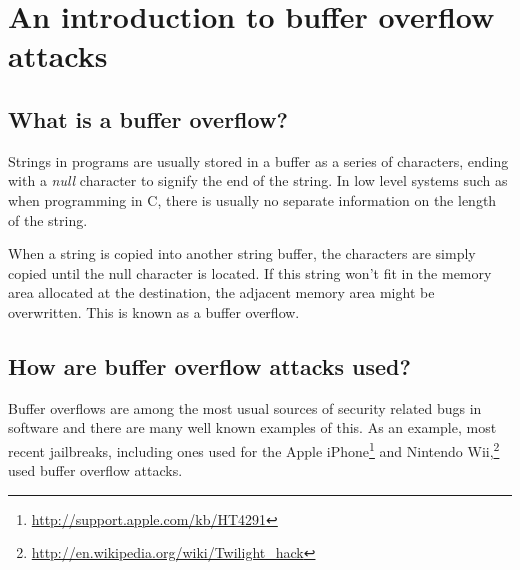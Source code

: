 \section{An introduction to buffer overflow attacks}
\subsection{What is a buffer overflow?}
Strings in programs are usually stored in a buffer as a series of characters,
ending with a \emph{null} character to signify the end of the string.
In low level systems such as when programming in C,
there is usually no separate information on the length of the string.

When a string is copied into another string buffer,
the characters are simply copied until the null character is located.
If this string won't fit in the memory area allocated at the destination,
the adjacent memory area might be overwritten.
This is known as a buffer overflow.

\subsection{How are buffer overflow attacks used?}
Buffer overflows are among the most usual sources of
security related bugs in software and
there are many well known examples of this.
As an example, most recent jailbreaks,
including ones used
for the Apple iPhone\footnote{\url{http://support.apple.com/kb/HT4291}}
and Nintendo Wii,\footnote{\url{http://en.wikipedia.org/wiki/Twilight_hack}}
used buffer overflow attacks.
